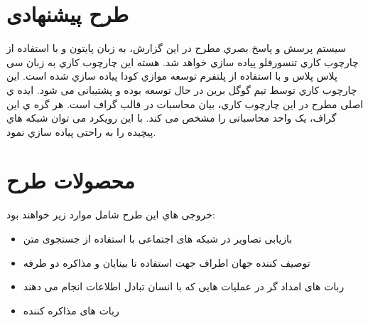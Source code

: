 \documentclass[paper=A4, fontsize=11pt]{article}
\numberwithin{equation}{section}
\numberwithin{figure}{section}
\numberwithin{table}{section}
\begin{document}
\section{طرح پیشنهادی}
\par
سیستم پرسش و پاسخ بصري مطرح در این گزارش، به زبان پایتون و با استفاده از چارچوب کاري
تنسورفلو پیاده سازي خواهد شد. هسته این چارچوب کاري به زبان سی پلاس پلاس و با استفاده از پلتفرم توسعه
موازي کودا پیاده سازي شده است. این چارچوب کاري توسط تیم گوگل برین در حال توسعه بوده و پشتیبانی
می شود.
ایده ي اصلی مطرح در این چارچوب کاري، بیان محاسبات در قالب گراف است. هر گره ي این گراف، یک واحد
محاسباتی را مشخص می کند. با این رویکرد می توان شبکه هاي پیچیده را به راحتی پیاده سازي نمود.

\section{محصولات طرح}
\par
خروجی هاي این طرح شامل موارد زیر خواهند بود:
\begin{itemize}
\item بازیابی تصاویر در شبکه های اجتماعی با استفاده از جستجوی متن
\item توصیف کننده جهان اطراف جهت استفاده نا بینایان و مذاکره دو طرفه
\item ربات های امداد گر در عملیات هایی که با انسان تبادل اطلاعات انجام می دهند
\item ربات های مذاکره کننده
\end{itemize}


\newpage
\end{document}
